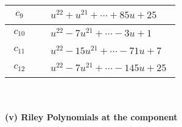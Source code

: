 \documentclass[1p]{elsarticle_modified}
\theoremstyle{definition}
\begin{document}
\begin{tabular}{m{50pt}|m{274pt}}
\hline $$\begin{aligned}c_{9}\end{aligned}$$&$\begin{aligned}
&u^{22}+u^{21}+\cdots+85 u+25
\end{aligned}$\\
\hline $$\begin{aligned}c_{10}\end{aligned}$$&$\begin{aligned}
&u^{22}-7 u^{21}+\cdots-3 u+1
\end{aligned}$\\
\hline $$\begin{aligned}c_{11}\end{aligned}$$&$\begin{aligned}
&u^{22}-15 u^{21}+\cdots-71 u+7
\end{aligned}$\\
\hline $$\begin{aligned}c_{12}\end{aligned}$$&$\begin{aligned}
&u^{22}-7 u^{21}+\cdots-145 u+25
\end{aligned}$\\
\hline
\end{tabular}\\~\\
\newpage\renewcommand{\arraystretch}{1}
\flushleft \textbf{(v) Riley Polynomials at the component}\newline \\
\end{document}
